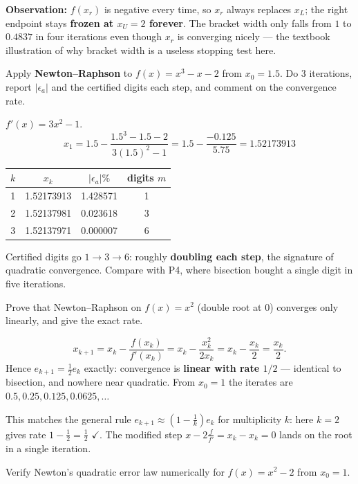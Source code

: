 \begin{probbox}
\textbf{Observation:} $f(x_r)$ is negative every time, so $x_r$ always replaces $x_L$; the right endpoint stays \textbf{frozen at $x_U = 2$ forever}. The bracket width only falls from $1$ to $0.4837$ in four iterations even though $x_r$ is converging nicely --- the textbook illustration of why bracket width is a useless stopping test here.

 Apply \textbf{Newton--Raphson} to $f(x)=x^3-x-2$ from $x_0 = 1.5$. Do 3 iterations, report $|\epsilon_a|$ and the certified digits each step, and comment on the convergence rate.

\ans $f'(x) = 3x^2-1$.
\[
x_1 = 1.5 - \frac{1.5^3-1.5-2}{3(1.5)^2-1} = 1.5 - \frac{-0.125}{5.75} = 1.52173913
\]
\begin{center}\small
\begin{tabular}{@{}cccc@{}}
\toprule
$k$ & $x_k$ & $|\epsilon_a|\%$ & digits $m$\\
\midrule
1 & 1.52173913 & 1.428571 & 1\\
2 & 1.52137981 & 0.023618 & 3\\
3 & 1.52137971 & 0.000007 & 6\\
\bottomrule
\end{tabular}
\end{center}
Certified digits go $1 \to 3 \to 6$: roughly \textbf{doubling each step}, the signature of quadratic convergence. Compare with P4, where bisection bought a single digit in five iterations.

 Prove that Newton--Raphson on $f(x)=x^2$ (double root at $0$) converges only linearly, and give the exact rate.

\ans
\[
x_{k+1} = x_k - \frac{f(x_k)}{f'(x_k)} = x_k - \frac{x_k^2}{2x_k} = x_k - \frac{x_k}{2} = \frac{x_k}{2}.
\]
Hence $e_{k+1} = \tfrac12 e_k$ exactly: convergence is \textbf{linear with rate $1/2$} --- identical to bisection, and nowhere near quadratic. From $x_0=1$ the iterates are $0.5, 0.25, 0.125, 0.0625, \dots$

This matches the general rule $e_{k+1}\approx\left(1-\frac1k\right)e_k$ for multiplicity $k$: here $k=2$ gives rate $1-\frac12 = \frac12$ $\checkmark$. The modified step $x - 2\frac{f}{f'} = x_k - x_k = 0$ lands on the root in a single iteration.

 Verify Newton's quadratic error law numerically for $f(x) = x^2-2$ from $x_0 = 1$.


\end{probbox}

